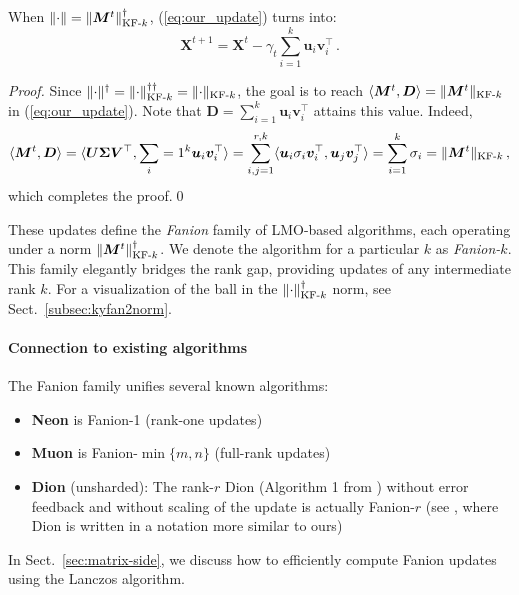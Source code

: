 \documentclass[smallextended,referee,envcountsect]{svjour3}
\def\vu{{\bm{u}}}
\def\vv{{\bm{v}}}
\def\mD{{\bm{D}}}
\def\mM{{\bm{M}}}
\def\mU{{\bm{U}}}
\def\mV{{\bm{V}}}
\def\mX{{\bm{X}}}
\def\mSigma{{\bm{\Sigma}}}
\newcommand{\norm}[1]{\lVert #1\rVert}
\DeclarePairedDelimiter{\normkfk}{\|}{\|_{\text{KF-}k}}
\def\<#1,#2>{\langle #1,#2\rangle}
\newcommand{\sectionref}[1]{Sect.~\ref{#1}}
\begin{document}
 \begin{lemma}\label{lemma:ky_fan_update}
   When $\norm{\cdot} = \normkfk{\mM^t}^\dagger$, (\ref{eq:our_update}) turns into:
   \begin{equation}\label{eq:ky_fan_update}
     \mX^{t+1} = \mX^{t} - \gamma_t \sum_{i=1}^{k}\vu_i \vv_i^\top\,.
   \end{equation}
 \end{lemma}
 
 \begin{proof}
 Since $\norm{\cdot}^\dagger = \normkfk{\cdot}^{\dagger\dagger} = \normkfk{\cdot}$, the goal is to reach $\<\mM^t, \mD> = \normkfk{\mM^t}$ in (\ref{eq:our_update}). Note that $\mD = \sum_{i=1}^{k} \vu_i \vv_i^\top$ attains this value. Indeed,
 \[
 \<\mM^t, \mD> =\<\mU \mSigma \mV^\top, \sum_{i=1}^{k} \vu_i \vv_i^\top> = \sum_{i,j=1}^{r, k}\<\vu_i \sigma_i \vv_i^\top, \vu_j \vv_j^\top> = \sum_{i=1}^{k}\sigma_i = \normkfk{\mM^t}\,,
 \]
 which completes the proof.\qed
\end{proof}
 
 These updates define the \emph{Fanion} family of LMO-based algorithms, each operating under a norm $\normkfk{\mM^t}^\dagger$. We denote the algorithm for a particular $k$ as \emph{Fanion-$k$}. This family elegantly bridges the rank gap, providing updates of any intermediate rank $k$. For a visualization of the ball in the $\normkfk{\cdot}^\dagger$ norm, see \sectionref{subsec:kyfan2norm}.
 
 \paragraph{Connection to existing algorithms}
 The Fanion family unifies several known algorithms:
 \begin{itemize}
   \item \textbf{Neon} is Fanion-1 (rank-one updates)
   \item \textbf{Muon} is Fanion-$\min\{m,n\}$ (full-rank updates)
   \item \textbf{Dion} (unsharded): The rank-$r$ Dion (Algorithm 1 from \citep{ahn2025dion}) without error feedback and without scaling of the update is actually Fanion-$r$ (see \citep{pethick2025understandingdion}, where Dion is written in a notation more similar to ours)
 \end{itemize}
 
 In \sectionref{sec:matrix-side}, we discuss how to efficiently compute Fanion updates using the Lanczos algorithm.
 
\end{document}
